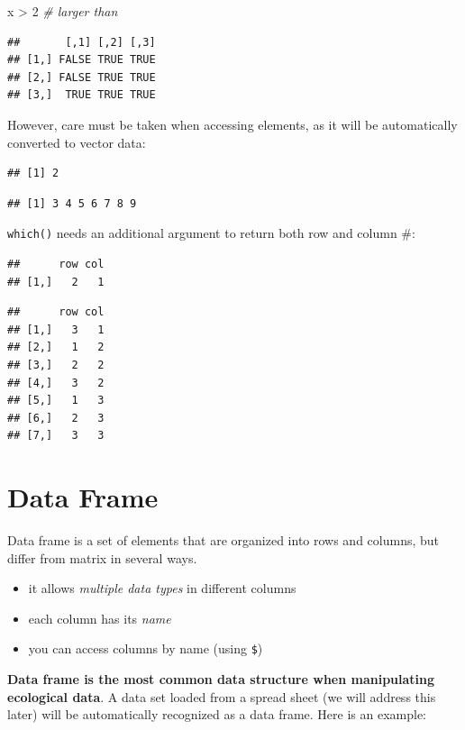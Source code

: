 \documentclass[
]{book}
\newenvironment{Shaded}{\begin{snugshade}}{\end{snugshade}}
\newcommand{\CommentTok}[1]{\textcolor[rgb]{0.56,0.35,0.01}{\textit{#1}}}
\newcommand{\DecValTok}[1]{\textcolor[rgb]{0.00,0.00,0.81}{#1}}
\newcommand{\NormalTok}[1]{#1}
\newcommand{\SpecialCharTok}[1]{\textcolor[rgb]{0.00,0.00,0.00}{#1}}
\providecommand{\tightlist}{%
  \setlength{\itemsep}{0pt}\setlength{\parskip}{0pt}}
\begin{document}
\begin{Shaded}
\begin{Highlighting}[]
\NormalTok{x }\SpecialCharTok{\textgreater{}} \DecValTok{2} \CommentTok{\# larger than}
\end{Highlighting}
\end{Shaded}

\begin{verbatim}
##       [,1] [,2] [,3]
## [1,] FALSE TRUE TRUE
## [2,] FALSE TRUE TRUE
## [3,]  TRUE TRUE TRUE
\end{verbatim}

However, care must be taken when accessing elements, as it will be automatically converted to vector data:

\begin{verbatim}
## [1] 2
\end{verbatim}

\begin{verbatim}
## [1] 3 4 5 6 7 8 9
\end{verbatim}

\texttt{which()} needs an additional argument to return both row and column \#:

\begin{verbatim}
##      row col
## [1,]   2   1
\end{verbatim}

\begin{verbatim}
##      row col
## [1,]   3   1
## [2,]   1   2
## [3,]   2   2
## [4,]   3   2
## [5,]   1   3
## [6,]   2   3
## [7,]   3   3
\end{verbatim}

\hypertarget{data-frame}{%
\section{Data Frame}\label{data-frame}}

Data frame is a set of elements that are organized into rows and columns, but differ from matrix in several ways.

\begin{itemize}
\tightlist
\item
  it allows \emph{multiple data types} in different columns
\item
  each column has its \emph{name}
\item
  you can access columns by name (using \texttt{\$})
\end{itemize}

\textbf{Data frame is the most common data structure when manipulating ecological data}. A data set loaded from a spread sheet (we will address this later) will be automatically recognized as a data frame. Here is an example:
\end{document}
